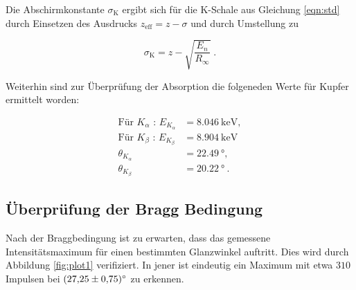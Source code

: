   Die Abschirmkonstante $\sigma_\text{K}$ ergibt sich für die K-Schale aus Gleichung
  \eqref{eqn:std} durch Einsetzen des Ausdrucks $z_\text{eff} = z -\sigma$ und durch 
  Umstellung zu 

  \begin{equation}
    \sigma_\text{K} = z - \sqrt{\frac{E_n}{R_{\infty}}} \; .
    \label{eqn:sigma}
  \end{equation}

  Weiterhin sind zur Überprüfung der Absorption die folgeneden Werte für Kupfer 
  ermittelt worden:

  \begin{align*}
    \text{Für } K_\alpha \text{ : } E_{K_\alpha} &= \SI{8.046}{\kilo\eV}, \\
    \text{Für } K_\beta \text{ : } E_{K_\beta} &= \SI{8.904}{\kilo\eV} \\
    \theta_{K_\alpha} &= \SI{22.49}{\degree}, \\
    \theta_{K_\beta} &= \SI{20.22}{\degree} \: .
 \end{align*}









\subsection{Überprüfung der Bragg Bedingung}

Nach der Braggbedingung ist zu erwarten, dass das gemessene Intensitätsmaximum
für einen bestimmten Glanzwinkel auftritt. 
Dies wird durch Abbildung \ref{fig:plot1} verifiziert. In jener ist eindeutig ein Maximum 
mit etwa $310$ Impulsen bei $\SI{27.25 +- 0.75}{\degree}$ zu erkennen.

